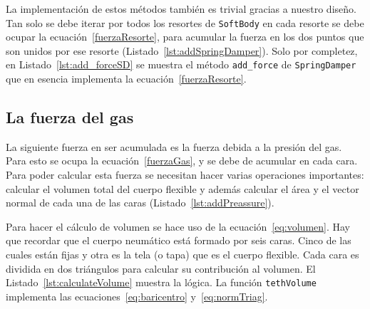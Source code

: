La implementación de estos métodos también es trivial gracias a nuestro diseño.
Tan solo se debe iterar por todos los resortes de \texttt{SoftBody} en cada resorte se debe ocupar la ecuación~\eqref{fuerzaResorte}, para acumular la fuerza en los dos puntos que son unidos por ese resorte (Listado~\ref{lst:addSpringDamper}).
Solo por completez, en Listado~\ref{lst:add_forceSD} se muestra el método \texttt{add_force} de \texttt{SpringDamper} que en esencia implementa la ecuación~\eqref{fuerzaResorte}.



\subsection{La fuerza del gas}
\label{sec:fuerzaGas}

La siguiente fuerza en ser acumulada es la fuerza debida a la presión del gas. Para esto se ocupa la ecuación~\eqref{fuerzaGas}, y se debe de acumular en cada cara.
Para poder calcular esta fuerza se necesitan hacer varias operaciones importantes: calcular el volumen total del cuerpo flexible y además calcular el área y el vector normal de cada una de las caras (Listado~\ref{lst:addPreassure}).


Para hacer el cálculo de volumen se hace uso de la ecuación~\eqref{eq:volumen}.
Hay que recordar que el cuerpo neumático está formado por seis caras.
Cinco de las cuales están fijas y otra es la tela (o tapa) que es el cuerpo flexible.
Cada cara es dividida en dos triángulos para calcular su contribución al volumen.
El Listado~\ref{lst:calculateVolume} muestra la lógica. La función \texttt{tethVolume} implementa las ecuaciones~\eqref{eq:baricentro} y~\eqref{eq:normTriag}.

